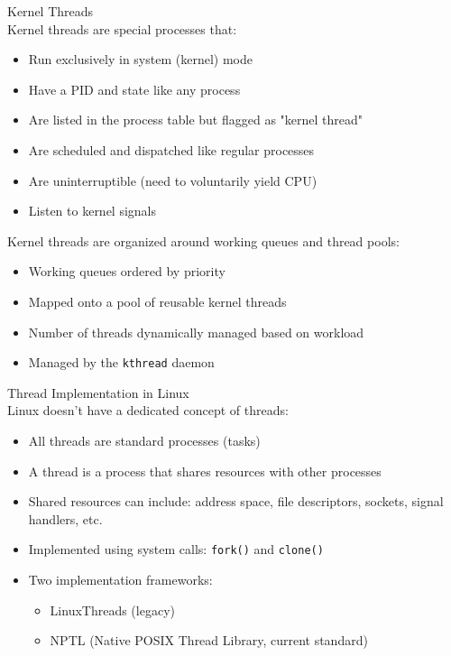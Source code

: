 \begin{definition}{Kernel Threads}\\
    Kernel threads are special processes that:
    \begin{itemize}
        \item Run exclusively in system (kernel) mode
        \item Have a PID and state like any process
        \item Are listed in the process table but flagged as "kernel thread"
        \item Are scheduled and dispatched like regular processes
        \item Are uninterruptible (need to voluntarily yield CPU)
        \item Listen to kernel signals
    \end{itemize}
    
    Kernel threads are organized around working queues and thread pools:
    \begin{itemize}
        \item Working queues ordered by priority
        \item Mapped onto a pool of reusable kernel threads
        \item Number of threads dynamically managed based on workload
        \item Managed by the \texttt{kthread} daemon
    \end{itemize}
\end{definition}

\begin{concept}{Thread Implementation in Linux}\\
    Linux doesn't have a dedicated concept of threads:
    \begin{itemize}
        \item All threads are standard processes (tasks)
        \item A thread is a process that shares resources with other processes
        \item Shared resources can include: address space, file descriptors, sockets, signal handlers, etc.
        \item Implemented using system calls: \texttt{fork()} and \texttt{clone()}
        \item Two implementation frameworks:
            \begin{itemize}
                \item LinuxThreads (legacy)
                \item NPTL (Native POSIX Thread Library, current standard)
            \end{itemize}
    \end{itemize}
\end{concept}

